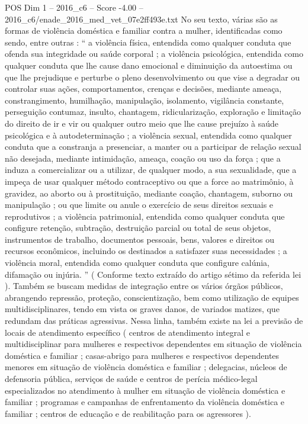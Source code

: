 \begin{textsample}{POS Dim 1 – 2016\_c6 – Score -4.00 – 2016\_c6/enade\_2016\_med\_vet\_07e2ff493e.txt}
No seu texto, várias são as formas de violência doméstica e familiar contra a mulher, identificadas como sendo, entre outras : “ a violência física, entendida como qualquer conduta que ofenda sua integridade ou saúde corporal ; a violência psicológica, entendida como qualquer conduta que lhe cause dano emocional e diminuição da autoestima ou que lhe prejudique e perturbe o pleno desenvolvimento ou que vise a degradar ou controlar suas ações, comportamentos, crenças e decisões, mediante ameaça, constrangimento, humilhação, manipulação, isolamento, vigilância constante, perseguição contumaz, insulto, chantagem, ridicularização, exploração e limitação do direito de ir e vir ou qualquer outro meio que lhe cause prejuízo à saúde psicológica e à autodeterminação ; a violência sexual, entendida como qualquer conduta que a constranja a presenciar, a manter ou a participar de relação sexual não desejada, mediante intimidação, ameaça, coação ou uso da força ; que a induza a comercializar ou a utilizar, de qualquer modo, a sua sexualidade, que a impeça de usar qualquer método contraceptivo ou que a force ao matrimônio, à gravidez, ao aborto ou à prostituição, mediante coação, chantagem, suborno ou manipulação ; ou que limite ou anule o exercício de seus direitos sexuais e reprodutivos ; a violência patrimonial, entendida como qualquer conduta que configure retenção, subtração, destruição parcial ou total de seus objetos, instrumentos de trabalho, documentos pessoais, bens, valores e direitos ou recursos econômicos, incluindo os destinados a satisfazer suas necessidades ; a violência moral, entendida como qualquer conduta que configure calúnia, difamação ou injúria. ” ( Conforme texto extraído do artigo sétimo da referida lei ).
Também se buscam medidas de integração entre os vários órgãos públicos, abrangendo repressão, proteção, conscientização, bem como utilização de equipes multidisciplinares, tendo em vista os graves danos, de variados matizes, que redundam das práticas agressivas.
Nessa linha, também existe na lei a previsão de locais de atendimento específico ( centros de atendimento integral e multidisciplinar para mulheres e respectivos dependentes em situação de violência doméstica e familiar ; casas-abrigo para mulheres e respectivos dependentes menores em situação de violência doméstica e familiar ; delegacias, núcleos de defensoria pública, serviços de saúde e centros de perícia médico-legal especializados no atendimento à mulher em situação de violência doméstica e familiar ; programas e campanhas de enfrentamento da violência doméstica e familiar ; centros de educação e de reabilitação para os agressores ).

\end{textsample}
